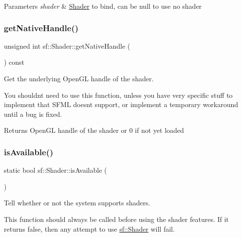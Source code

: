 \begin{DoxyParams}{Parameters}
{\em shader} & \hyperlink{classsf_1_1_shader}{Shader} to bind, can be null to use no shader \\
\hline
\end{DoxyParams}
\mbox{\label{classsf_1_1_shader_ac14d0bf7afe7b6bb415d309f9c707188}} 
\subsubsection{\texorpdfstring{get\+Native\+Handle()}{getNativeHandle()}}
{\footnotesize\ttfamily unsigned int sf\+::\+Shader\+::get\+Native\+Handle (\begin{DoxyParamCaption}{ }\end{DoxyParamCaption}) const}



Get the underlying Open\+GL handle of the shader. 

You shouldn\textquotesingle{}t need to use this function, unless you have very specific stuff to implement that S\+F\+ML doesn\textquotesingle{}t support, or implement a temporary workaround until a bug is fixed.

\begin{DoxyReturn}{Returns}
Open\+GL handle of the shader or 0 if not yet loaded 
\end{DoxyReturn}
\mbox{\label{classsf_1_1_shader_ad22474690bafe4a305c1b9826b1bd86a}} 
\subsubsection{\texorpdfstring{is\+Available()}{isAvailable()}}
{\footnotesize\ttfamily static bool sf\+::\+Shader\+::is\+Available (\begin{DoxyParamCaption}{ }\end{DoxyParamCaption})\hspace{0.3cm}{\ttfamily [static]}}



Tell whether or not the system supports shaders. 

This function should always be called before using the shader features. If it returns false, then any attempt to use \hyperlink{classsf_1_1_shader}{sf\+::\+Shader} will fail.

